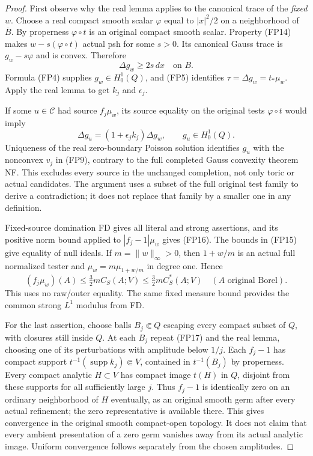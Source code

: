 \begin{proof}
First observe why the real lemma applies to the canonical trace
of the \emph{fixed} $w$. Choose a real compact smooth scalar
$\varphi$ equal to $|x|^2/2$ on a neighborhood of
$\overline B$. By properness $\varphi\circ t$ is an original
compact smooth scalar. Property (FP14) makes
$w-s(\varphi\circ t)$ actual psh for some $s>0$. Its canonical
Gauss trace is $g_w-s\varphi$ and is convex. Therefore
\[
                    \Delta g_w\ge2s\,dx\quad\text{on }B.
 \tag{FP17}
\]
Formula (FP4) supplies $g_w\in H_0^1(Q)$, and (FP5) identifies
$\tau=\Delta g_w=t_*\mu_w$. Apply the real lemma to get $k_j$
and $\epsilon_j$.

If some $u\in\mathscr C$ had source $f_j\mu_w$, its source
equality on the original tests $\varphi\circ t$ would imply
\[
 \Delta g_u=(1+\epsilon_j k_j)\Delta g_w,
                   \qquad g_u\in H_0^1(Q).
 \tag{FP18}
\]
Uniqueness of the real zero-boundary Poisson solution identifies
$g_u$ with the nonconvex $v_j$ in (FP9), contrary to the full
completed Gauss convexity theorem NF. This excludes every source
in the unchanged completion, not only toric or actual candidates.
The argument uses a subset of the full original test family to
derive a contradiction; it does not replace that family by a
smaller one in any definition.

Fixed-source domination FD gives all literal and strong assertions,
and its positive norm bound applied to $|f_j-1|\mu_w$ gives
(FP16). The bounds in (FP15) give equality of null ideals.
If $m=\|w\|_\infty>0$, then $1+w/m$ is an actual full normalized
tester and $\mu_w=m\mu_{1+w/m}$ in degree one. Hence
\[
       (f_j\mu_w)(A)\le\tfrac32 m C_S(A;V)
                  \le\tfrac32 m C_S^*(A;V)
                 \quad(A\text{ original Borel}).
 \tag{FP19}
\]
This uses no raw/outer equality. The same fixed measure bound
provides the common strong $L^1$ modulus from FD.

For the last assertion, choose balls $B_j\Subset Q$ escaping
every compact subset of $Q$, with closures still inside $Q$.
At each $B_j$ repeat (FP17) and the real lemma, choosing one
of its perturbations with amplitude below $1/j$. Each
$f_j-1$ has compact support
$t^{-1}(\operatorname{supp}k_j)\Subset V$, contained in
$t^{-1}(B_j)$ by properness.
Every compact analytic $H\subset V$ has compact image $t(H)$
in $Q$, disjoint from these supports for all sufficiently large
$j$. Thus $f_j-1$ is identically zero on an ordinary neighborhood
of $H$ eventually, as an original smooth germ after every actual
refinement; the zero representative is available there.
This gives convergence in the original smooth compact-open topology.
It does not claim that every ambient presentation of a zero germ
vanishes away from its actual analytic image.
Uniform convergence follows separately from the chosen amplitudes.
\end{proof}

